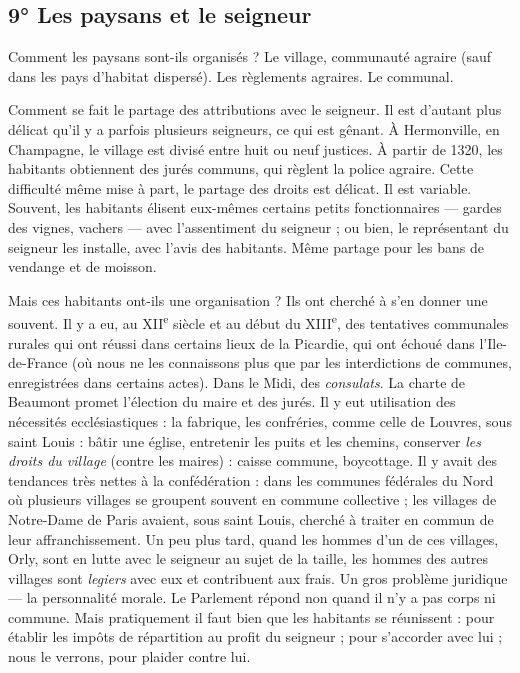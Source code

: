 \documentclass[french,twoside]{book} %
\begin{document}
\subsection[9° Les paysans et le seigneur]{9° Les paysans et le seigneur}
\noindent Comment les paysans sont-ils organisés ? Le village, communauté agraire (sauf dans les pays d’habitat dispersé). Les règlements agraires. Le communal.\par
Comment se fait le partage des attributions avec le seigneur. Il est d’autant plus délicat qu’il y a parfois plusieurs seigneurs, ce qui est gênant. À Hermonville, en Champagne, le village est divisé entre huit ou neuf justices. À partir de 1320, les habitants obtiennent des jurés communs, qui règlent la police agraire. Cette difficulté même mise à part, le partage des droits est délicat. Il est variable. Souvent, les habitants élisent eux-mêmes certains petits fonctionnaires — gardes des vignes, vachers — avec l’assentiment du seigneur ; ou bien, le représentant du seigneur les installe, avec l’avis des habitants. Même partage pour les bans de vendange et de moisson.\par
Mais ces habitants ont-ils une organisation ? Ils ont cherché à s’en donner une souvent. Il y a eu, au XII\textsuperscript{e} siècle et au début du XIII\textsuperscript{e}, des tentatives communales rurales qui ont réussi dans certains lieux de la Picardie, qui ont échoué dans l’Ile-de-France (où nous ne les connaissons plus que par les interdictions de communes, enregistrées dans certains actes). Dans le Midi, des \emph{consulats}. La charte de Beaumont promet l’élection du maire et des jurés. Il y eut utilisation des nécessités ecclésiastiques : la fabrique, les confréries, comme celle de Louvres, sous saint Louis : bâtir une église, entretenir les puits et les chemins, conserver \emph{les droits du village} (contre les maires) : caisse commune, boycottage. Il y  
\label{p63} avait des tendances très nettes à la confédération : dans les communes fédérales du Nord où plusieurs villages se groupent souvent en commune collective ; les villages de Notre-Dame de Paris avaient, sous saint Louis, cherché à traiter en commun de leur affranchissement. Un peu plus tard, quand les hommes d’un de ces villages, Orly, sont en lutte avec le seigneur au sujet de la taille, les hommes des autres villages sont \emph{legiers} avec eux et contribuent aux frais. Un gros problème juridique — la personnalité morale. Le Parlement répond non quand il n’y a pas corps ni commune. Mais pratiquement il faut bien que les habitants se réunissent : pour établir les impôts de répartition au profit du seigneur ; pour s’accorder avec lui ; nous le verrons, pour plaider contre lui.\par
\end{document}
